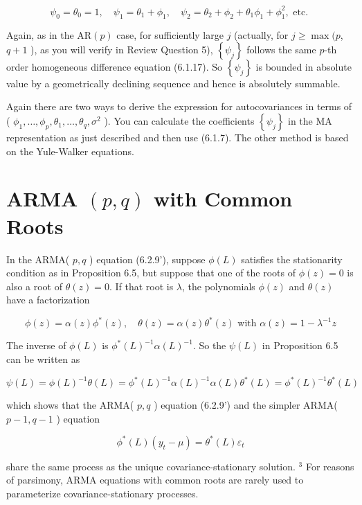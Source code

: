 \documentclass[10pt]{article}
\begin{document}
$$
\psi_{0}=\theta_{0}=1, \quad \psi_{1}=\theta_{1}+\phi_{1}, \quad \psi_{2}=\theta_{2}+\phi_{2}+\theta_{1} \phi_{1}+\phi_{1}^{2}, \text { etc. }
$$

Again, as in the $\mathrm{AR}(p)$ case, for sufficiently large $j$ (actually, for $j \geq \max (p$, $q+1$ ), as you will verify in Review Question 5), $\left\{\psi_{j}\right\}$ follows the same $p$-th order homogeneous difference equation (6.1.17). So $\left\{\psi_{j}\right\}$ is bounded in absolute value by a geometrically declining sequence and hence is absolutely summable.

Again there are two ways to derive the expression for autocovariances in terms of ( $\phi_{1}, \ldots, \phi_{p}, \theta_{1}, \ldots, \theta_{q}, \sigma^{2}$ ). You can calculate the coefficients $\left\{\psi_{j}\right\}$ in the MA representation as just described and then use (6.1.7). The other method is based on the Yule-Walker equations.

\section*{ARMA $(p, q)$ with Common Roots}
In the ARMA( $p, q$ ) equation (6.2.9'), suppose $\phi(L)$ satisfies the stationarity condition as in Proposition 6.5, but suppose that one of the roots of $\phi(z)=0$ is also a root of $\theta(z)=0$. If that root is $\lambda$, the polynomials $\phi(z)$ and $\theta(z)$ have a factorization

$$
\phi(z)=\alpha(z) \phi^{*}(z), \quad \theta(z)=\alpha(z) \theta^{*}(z) \text { with } \alpha(z)=1-\lambda^{-1} z
$$

The inverse of $\phi(L)$ is $\phi^{*}(L)^{-1} \alpha(L)^{-1}$. So the $\psi(L)$ in Proposition 6.5 can be written as


\begin{equation*}
\psi(L)=\phi(L)^{-1} \theta(L)=\phi^{*}(L)^{-1} \alpha(L)^{-1} \alpha(L) \theta^{*}(L)=\phi^{*}(L)^{-1} \theta^{*}(L) \tag{6.2.12}
\end{equation*}


which shows that the ARMA( $p, q$ ) equation (6.2.9') and the simpler ARMA( $p- 1, q-1$ ) equation

$$
\phi^{*}(L)\left(y_{t}-\mu\right)=\theta^{*}(L) \varepsilon_{t}
$$

share the same process as the unique covariance-stationary solution. ${ }^{3}$ For reasons of parsimony, ARMA equations with common roots are rarely used to parameterize covariance-stationary processes.
\end{document}
